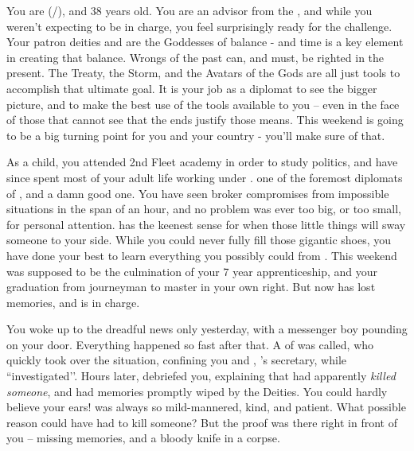\documentclass[char]{GL2020}
\begin{document}
\name{\cJuniorStatesman{}}

You are \cJuniorStatesman{\full} (\cJuniorStatesman{\they}/\cJuniorStatesman{\them}), and 38 years old. You are an advisor from the \pShip{}, and while you weren't expecting to be in charge, you feel surprisingly ready for the challenge. Your patron deities \cEbbFull{\full} and \cFlowFull{\full} are the Goddesses of balance - and time is a key element in creating that balance. Wrongs of the past can, and must, be righted in the present. The Treaty, the Storm, and the Avatars of the Gods are all just tools to accomplish that ultimate goal. It is your job as a diplomat to see the bigger picture, and to make the best use of the tools available to you -- even in the face of those that cannot see that the ends justify those means. This weekend is going to be a big turning point for you and your country - you'll make sure of that.

As a child, you attended 2nd Fleet academy in order to study politics, and have since spent most of your adult life working under \cHeadDiplomat{\full}. \cHeadDiplomat{\Theyare} one of the foremost diplomats of \pShip{}, and a damn good one. You have seen \cHeadDiplomat{\them} broker compromises from impossible situations in the span of an hour, and no problem was ever too big, or too small, for \cHeadDiplomat{\their} personal attention. \cHeadDiplomat{} has the keenest sense for when those little things will sway someone to your side. While you could never fully fill those gigantic shoes, you have done your best to learn everything you possibly could from \cHeadDiplomat{\them}. This weekend was supposed to  be the culmination of your 7 year apprenticeship, and your graduation from journeyman to master in your own right. But now \cHeadDiplomat{} has lost \cHeadDiplomat{\their} memories, and \cEbbPriest{\full} is in charge. 

You woke up to the dreadful news only yesterday, with a messenger boy pounding on your door. Everything happened so fast after that. A \cEbbPriest{\cleric} of \cEbb{} was called, who quickly took over the situation, confining you and \cChupLeader{\full}, \cHeadDiplomat{}'s secretary, while \cEbbPriest{\they} ``investigated'’. Hours later, \cEbbPriest{} debriefed you, explaining that \cHeadDiplomat{} had apparently \emph{killed someone}, and had \cHeadDiplomat{\their} memories promptly wiped by the Deities. You could hardly believe your ears! \cHeadDiplomat{} was always so mild-mannered, kind, and patient. What possible reason could \cHeadDiplomat{\they} have had to kill someone? But the proof was there right in front of you -- missing memories, and a bloody knife in a corpse.
\end{document}
